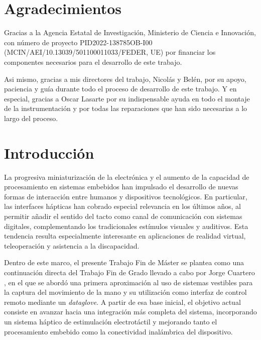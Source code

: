 \documentclass[12pt]{article}
\def\acknowledgmentsname{Agradecimientos}
\begin{document}

\addcontentsline{toc}{section}{\acknowledgmentsname}
\section*{\acknowledgmentsname} 

Gracias a la Agencia Estatal de Investigación, Ministerio de Ciencia e Innovación, con número de proyecto PID2022-138785OB-I00 (MCIN/AEI/10.13039/501100011033/FEDER, UE) por financiar los componentes necesarios para el desarrollo de este trabajo.

Asi mismo, gracias a mis directores del trabajo, Nicolás y Belén, por su apoyo, paciencia y guía durante todo el proceso de desarrollo de este trabajo. Y en especial, gracias a Oscar Lasarte por su indispensable ayuda en todo el montaje de la instrumentación y por todas las reparaciones que han sido necesarias a lo largo del proceso.

\listoffigures        %
\listoftables         %

\printglossary[type=\acronymtype, title={Lista de Acrónimos}]
\clearpage

\newpage

\tableofcontents
\newpage


\section{Introducción}

La progresiva miniaturización de la electrónica y el aumento de la capacidad de procesamiento en sistemas embebidos han impulsado el desarrollo de nuevas formas de interacción entre humanos y dispositivos tecnológicos. En particular, las interfaces hápticas han cobrado especial relevancia en los últimos años, al permitir añadir el sentido del tacto como canal de comunicación con sistemas digitales, complementando los tradicionales estímulos visuales y auditivos. Esta tendencia resulta especialmente interesante en aplicaciones de realidad virtual, teleoperación y asistencia a la discapacidad.

Dentro de este marco, el presente Trabajo Fin de Máster se plantea como una continuación directa del Trabajo Fin de Grado llevado a cabo por Jorge Cuartero \cite{TFG}, en el que se abordó una primera aproximación al uso de sistemas vestibles para la captura del movimiento de la mano y su utilización como interfaz de control remoto mediante un \textit{dataglove}. A partir de esa base inicial, el objetivo actual consiste en avanzar hacia una integración más completa del sistema, incorporando un sistema háptico de estimulación electrotáctil y mejorando tanto el procesamiento embebido como la conectividad inalámbrica del dispositivo.
\end{document}
